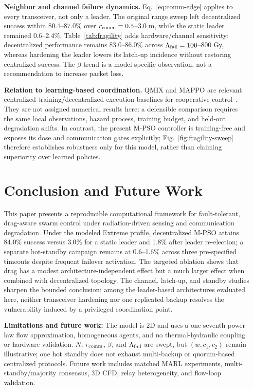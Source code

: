 \documentclass[conference]{IEEEtran}
\begin{document}
\textbf{Neighbor and channel failure dynamics.} Eq.~\ref{eq:comm-edge} applies to every transceiver, not only a leader. The original range sweep left decentralized success within 80.4--87.0\% over $r_{\rm comm}=0.5$--3.0 m, while the static leader remained 0.6--2.4\%. Table~\ref{tab:fragility} adds hardware/channel sensitivity: decentralized performance remains 83.0--86.0\% across $\Lambda_{\rm fail}=100$--800 Gy, whereas hardening the leader lowers its latch-up incidence without restoring centralized success. The $\beta$ trend is a model-specific observation, not a recommendation to increase packet loss.

\textbf{Relation to learning-based coordination.} QMIX and MAPPO are relevant centralized-training/decentralized-execution baselines for cooperative control~\cite{rashid_qmix_2018,yu_mappo_2022}. They are not assigned numerical results here: a defensible comparison requires the same local observations, hazard process, training budget, and held-out degradation shifts. In contrast, the present M-PSO controller is training-free and exposes its dose and communication gates explicitly; Fig.~\ref{fig:fragility-sweep} therefore establishes robustness only for this model, rather than claiming superiority over learned policies.

\section{Conclusion and Future Work}
\label{sec:conclusion}

This paper presents a reproducible computational framework for fault-tolerant, drag-aware swarm control under radiation-driven sensing and communication degradation. Under the modeled Extreme profile, decentralized M-PSO attains 84.0\% success versus 3.0\% for a static leader and 1.8\% after leader re-election; a separate hot-standby campaign remains at 0.6--1.6\% across three pre-specified timeouts despite frequent failover activation. The targeted ablation shows that drag has a modest architecture-independent effect but a much larger effect when combined with decentralized topology. The channel, latch-up, and standby studies sharpen the bounded conclusion: among the leader-based architectures evaluated here, neither transceiver hardening nor one replicated backup resolves the vulnerability induced by a privileged coordination point.

\textbf{Limitations and future work:} The model is 2D and uses a one-seventh-power-law flow approximation, homogeneous agents, and no thermal-hydraulic coupling or hardware validation. $N$, $r_{\rm comm}$, $\beta$, and $\Lambda_{\rm fail}$ are swept, but $(w,c_1,c_2)$ remain illustrative; one hot standby does not exhaust multi-backup or quorum-based centralized protocols. Future work includes matched MARL experiments, multi-standby/majority consensus, 3D CFD, relay heterogeneity, and flow-loop validation.
\end{document}
